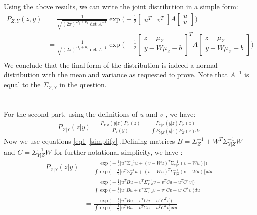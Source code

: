 \documentclass[11pt,a4paper]{article}
\begin{document}
Using the above results, we can write the joint distribution in a simple form:
\begin{equation} 
\begin{split}
P_{Z,Y}(z,y)&=\frac{1}{\sqrt{(2\pi)^{D_y+D_z}\det A^{-1}}}\exp \Big(-\frac{1}{2}
\begin{bmatrix} u^T & v^T \end{bmatrix}
A
\begin{bmatrix} u \\ v \end{bmatrix}
\Big) \\
&=\boxed{\frac{1}{\sqrt{(2\pi)^{D_y+D_z}\det A^{-1}}}\exp \Big(-\frac{1}{2}
\begin{bmatrix} z-\mu_Z \\ y-W\mu_Z-b \end{bmatrix}^T
A
\begin{bmatrix} z-\mu_Z \\ y-W\mu_Z-b \end{bmatrix}
\Big)} \\
\end{split}
\end{equation}
We conclude that the final form of the distribution is indeed a normal distribution with the mean and variance as requested to prove. Note that $A^{-1}$ is equal to the $\Sigma_{Z,Y}$ in the question. 
\\
\\
\\
For the second part, using the definitions of $u$ and $v$ , we have:
\begin{align}\label{eq2}
P_{Z|Y}(z|y)=\frac{P_{Y|Z}(y|z)P_Z(z)}{P_Y(y)}=\frac{P_{Y|Z}(y|z)P_Z(z)}{\int P_{Y|Z}(y|z)P_Z(z) dz}
\end{align}
Now we use equations \eqref{eq1} \eqref{simplify} .Defining matrices $B=\Sigma_{Z}^{-1}+W^T\Sigma_{Y|Z}^{-1}W$ and $C=\Sigma_{Y|Z}^{-1}W$ for further notational simplicity, we have :
\begin{equation} \label{eq7}
\begin{split}
P_{Z|Y}(z|y)&=\frac{\exp \Big(-\frac{1}{2}\big[u^T\Sigma_{Z}^{-1} u+(v-Wu)^T\Sigma_{Y|Z}^{-1}(v-Wu)\big]\Big) }{\int \exp \Big(-\frac{1}{2}\big[u^T\Sigma_{Z}^{-1} u+(v-Wu)^T\Sigma_{Y|Z}^{-1}(v-Wu)\big]\Big) du}\\
&=\frac{\exp \Big(-\frac{1}{2}\big[u^TBu+v^T\Sigma_{Y|Z}^{-1}v-v^TCu-u^TC^Tv\big]\Big) }{\int \exp \Big(-\frac{1}{2}\big[u^TBu+v^T\Sigma_{Y|Z}^{-1}v-v^TCu-u^TC^Tv\big]\Big) du} \\
&=\frac{\exp \Big(-\frac{1}{2}\big[u^TBu-v^TCu-u^TC^Tv\big]\Big) }{\int \exp \Big(-\frac{1}{2}\big[u^TBu-v^TCu-u^TC^Tv\big]\Big) du}
\end{split}
\end{equation}
\end{document}
